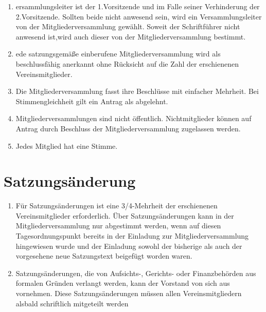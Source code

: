 \begin{enumerate}
\begin{enumerate}[label={(\alph*)}]
    \item Aufnahme von Darlehen,
    \item Genehmigung aller Geschäftsordnungen für den Vereinsbereich,
    \item Mitgliedsbeiträge,
    \item Satzungsänderungen,
    \item Auflösung des Vereins.
  \end{enumerate}
  \item ersammlungsleiter ist der 1.Vorsitzende und im Falle seiner Verhinderung der 2.Vorsitzende. Sollten beide nicht anwesend sein, wird ein Versammlungsleiter von der Mitgliederversammlung gewählt. Soweit der Schriftführer nicht anwesend ist,wird auch dieser von der Mitgliederversammlung bestimmt.
  \item ede satzungsgemäße einberufene Mitgliederversammlung wird als beschlussfähig anerkannt ohne Rücksicht auf die Zahl der erschienenen Vereinsmitglieder.
  \item Die Mitgliederversammlung fasst ihre Beschlüsse mit einfacher Mehrheit. Bei Stimmengleichheit gilt ein Antrag als abgelehnt.
  \item Mitgliederversammlungen sind nicht öffentlich. Nichtmitglieder können auf Antrag durch Beschluss der Mitgliederversammlung zugelassen werden.
  \item Jedes Mitglied hat eine Stimme.
\end{enumerate}

\section{Satzungsänderung}
\begin{enumerate}
  \item Für Satzungsänderungen ist eine 3/4-Mehrheit der erschienenen Vereinsmitglieder erforderlich. Über Satzungsänderungen kann in der Mitgliederversammlung nur abgestimmt werden, wenn auf diesen Tagesordnungspunkt bereits in der Einladung zur Mitgliederversammlung hingewiesen wurde und der Einladung sowohl der bisherige als auch der vorgesehene neue Satzungstext beigefügt worden waren.
  \item Satzungsänderungen, die von Aufsichts-, Gerichts- oder Finanzbehörden aus formalen Gründen verlangt werden, kann der Vorstand von sich aus vornehmen. Diese Satzungsänderungen müssen allen Vereinsmitgliedern alsbald schriftlich mitgeteilt werden
\end{enumerate}

